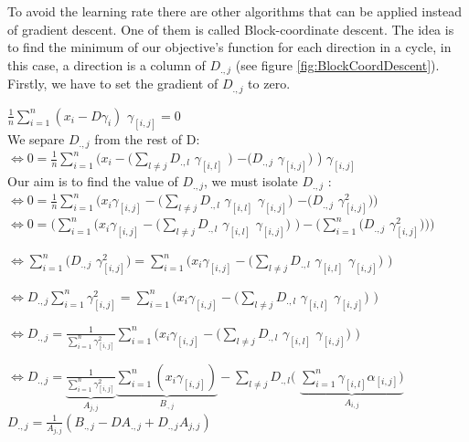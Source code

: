 To avoid the learning rate there are other algorithms that can be applied instead of gradient descent. One of them is called Block-coordinate descent. The idea is to find the minimum of our objective's function for each direction in a cycle, in this case, a direction is a column of $D_{., j}$ (see figure \ref{fig:BlockCoordDescent}). Firstly, we have to set the gradient of $D_{., j}$ to zero.\\
\begin{center}
 $ \frac{1}{n}\sum_{i=1}^{n} (x_i - D \gamma_i)$ $\gamma_{[i,j]} = 0$\\ \vspace{0.4cm}
 We separe $D_{.,j}$ from the rest of D:\\
 $\iff 0 = \frac{1}{n}\sum_{i=1}^{n} (x_i - (\sum_{l \neq j}D_{.,l}$ $\gamma_{[i,l]}$ $ )$  $ - (D_{.,j}$ $\gamma_{[i,j]})$ ) $ \gamma_{[i,j]}$\\ \vspace{0.4cm}
 Our aim is to find the value of $D_{.,j}$, we must isolate $D_{.,j}$ :\\
 $\iff 0 = \frac{1}{n} \sum_{i=1}^{n}(x_i \gamma_{[i,j]} - (\sum_{l \neq j}D_{.,l}$ $\gamma_{[i,l]}$ $\gamma_{[i,j]} )$  $ - (D_{.,j}$ $\gamma^2_{[i,j]}))$\\ \vspace{0.2cm}
  $\iff 0 = (\sum_{i=1}^{n}(x_i \gamma_{[i,j]} - (\sum_{l \neq j}D_{.,l}$ $\gamma_{[i,l]}$ $\gamma_{[i,j]} )$  $) - ( \sum_{i=1}^{n}( D_{.,j}$ $\gamma_{[i,j]}^2)))$\\ \vspace{0.2cm}
  
  $ \iff \sum_{i=1}^{n}( D_{.,j}$ $\gamma^2_{[i,j]}) = \sum_{i=1}^{n}(x_i \gamma_{[i,j]} - (\sum_{l \neq j}D_{.,l}$ $\gamma_{[i,l]}$ $\gamma_{[i,j]} )$  $) $\\  \vspace{0.2cm}
  
  $\iff D_{.,j}  \sum_{i=1}^{n} \gamma^2_{[i,j]} = \sum_{i=1}^{n}(x_i \gamma_{[i,j]} - (\sum_{l \neq j}D_{.,l}$ $\gamma_{[i,l]}$ $\gamma_{[i,j]} )$  $) $\\ \vspace{0.2cm}
  
$\iff D_{.,j}  =\frac{1}{ \sum_{i=1}^{n} \gamma^2_{[i,j]}}\sum_{i=1}^{n}(x_i \gamma_{[i,j]} - (\sum_{l \neq j}D_{.,l}$ $\gamma_{[i,l]}$ $\gamma_{[i,j]})$  $) $\\ \vspace{0.2cm}

$\iff D_{.,j}  =\underbrace{\frac{1}{ \sum_{i=1}^{n} \gamma^2_{[i,j]}}}_{A_{j, j}} \underbrace{\sum_{i=1}^{n}(x_i \gamma_{[i,j]})}_{B_{., j}}  - \sum_{l \neq j}D_{., l}($ $\underbrace{\sum_{i=1}^{n} \gamma_{[i,l]} \alpha_{[i,j]} ) }_{A_{i,j}}$\\ \vspace{0.2cm}
$D_{., j} = \frac{1}{A_{j, j}}(B_{., j} - D A_{., j} + D_{., j}A_{j, j})$
\end{center}  

